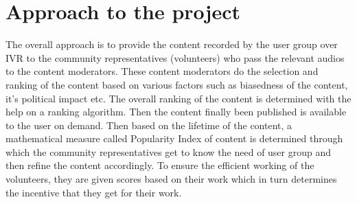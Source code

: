 \documentclass[11pt]{article}
\begin{document}
\section{Approach to the project}
    The overall approach is to provide the content recorded by the user group over IVR to the community representatives (volunteers) who pass the relevant audios to the content moderators. These content moderators do the selection and ranking of the content based on various factors such as biasedness of the content, it's political impact etc. The overall ranking of the content is determined with the help on a ranking algorithm. Then the content finally been published is available to the user on demand. Then based on the lifetime of the content, a mathematical measure called Popularity Index of content is determined through which the community representatives get to know the need of user group and then refine the content accordingly. To ensure the efficient working of the volunteers, they are given scores based on their work which in turn determines the incentive that they get for their work.
\end{document}

